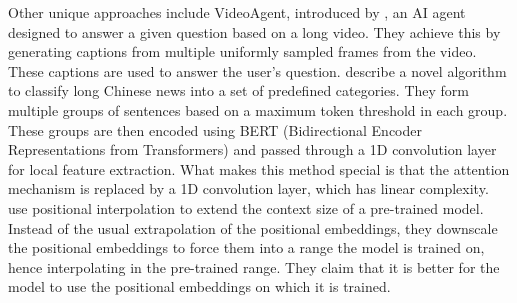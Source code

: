 	Other unique approaches include VideoAgent, introduced by \citet{wang2024videoagent}, an AI agent
	designed to answer a given question based on a long video.
	They achieve this by generating captions from multiple uniformly sampled frames from the video.
	These captions are used to answer the user's question.
	\citet{chen2022long} describe a novel algorithm to classify long Chinese news into a set of
	predefined categories.
	They form multiple groups of sentences based on a maximum token threshold in each group.
	These groups are then encoded using BERT (Bidirectional Encoder Representations from Transformers)
	and passed through a 1D convolution layer for local feature extraction.
	What makes this method special is that the attention mechanism is replaced by a 1D convolution layer,
	which has linear complexity.
	\citet{chen2023extending} use positional interpolation to extend the context size of a pre-trained
	model.
	Instead of the usual extrapolation of the positional embeddings, they downscale the positional
	embeddings to force them into a range the model is trained on, hence interpolating in the pre-trained
	range.
	They claim that it is better for the model to use the positional embeddings on which it is trained.
